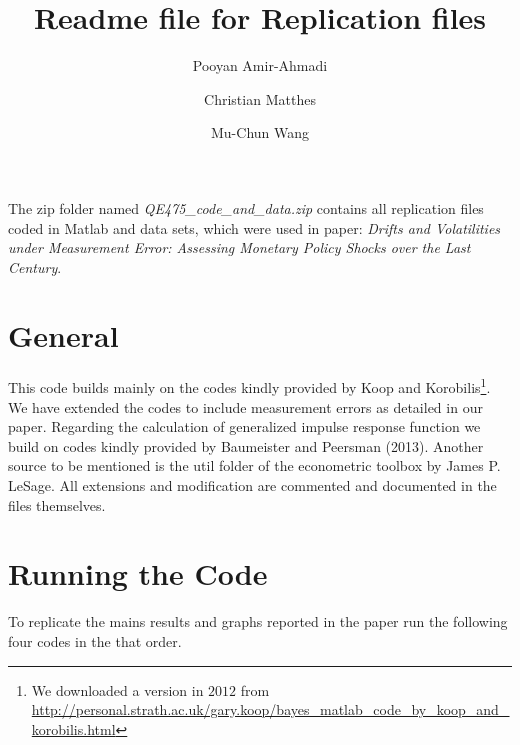 \documentclass[12pt]{article}
\begin{document}
\title{Readme file for Replication files}
\author{Pooyan Amir-Ahmadi
\and Christian Matthes
\and Mu-Chun Wang
}

\maketitle



The zip folder named \emph{QE475\_code\_and\_data.zip} contains all replication files coded in Matlab and data sets, which were used in paper: {\emph{Drifts and Volatilities under Measurement Error: Assessing Monetary Policy Shocks over the Last Century}}. 

\section{General}

This code builds mainly on the codes kindly provided by Koop and Korobilis\footnote{We downloaded a version in $2012$ from\\\href{http://personal.strath.ac.uk/gary.koop/bayes_matlab_code_by_koop_and_korobilis.html}{http://personal.strath.ac.uk/gary.koop/bayes\_matlab\_code\_by\_koop\_and\_korobilis.html}}. We have extended the codes to include measurement errors as detailed in our paper. Regarding the calculation of generalized impulse response function we build on codes kindly provided by Baumeister and Peersman (2013). Another source to be mentioned is the util folder of the econometric toolbox by James P. LeSage. All extensions and modification are commented and documented in the files themselves. 


\section{Running the Code}
To replicate the mains results and graphs reported in the paper run the following four codes in the that order. 
\end{document}

